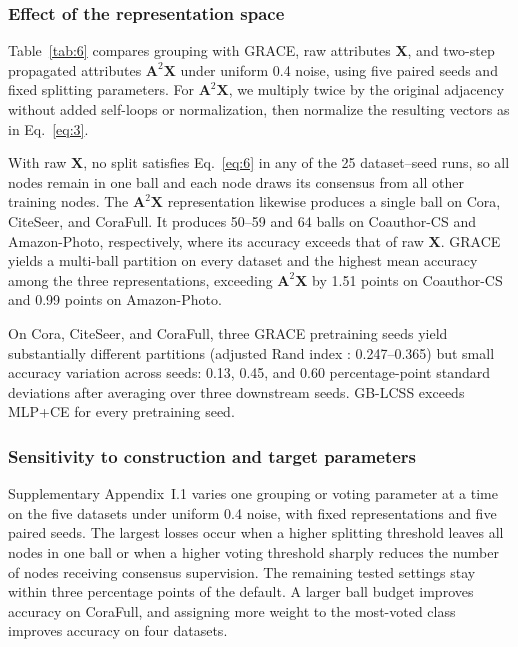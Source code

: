 \documentclass[times,review,10pt]{elsarticle}
\theoremstyle{definition}
\theoremstyle{plain}
\begin{document}
\subsubsection{Effect of the representation space}\label{sec:4.3.3}

Table~\ref{tab:6} compares grouping with GRACE, raw attributes \(\mathbf X\), and two-step propagated attributes \(\mathbf A^2\mathbf X\) under uniform 0.4 noise, using five paired seeds and fixed splitting parameters. For \(\mathbf A^2\mathbf X\), we multiply twice by the original adjacency without added self-loops or normalization, then normalize the resulting vectors as in Eq.~\eqref{eq:3}.



With raw \(\mathbf{X}\), no split satisfies Eq.~\eqref{eq:6} in any of the 25 dataset--seed runs, so all nodes remain in one ball and each node draws its consensus from all other training nodes. The \(\mathbf{A}^2\mathbf{X}\) representation likewise produces a single ball on Cora, CiteSeer, and CoraFull. It produces 50--59 and 64 balls on Coauthor-CS and Amazon-Photo, respectively, where its accuracy exceeds that of raw \(\mathbf{X}\). GRACE yields a multi-ball partition on every dataset and the highest mean accuracy among the three representations, exceeding \(\mathbf{A}^2\mathbf{X}\) by 1.51 points on Coauthor-CS and 0.99 points on Amazon-Photo. 

On Cora, CiteSeer, and CoraFull, three GRACE pretraining seeds yield substantially different partitions (adjusted Rand index \cite{ref74}: 0.247--0.365) but small accuracy variation across seeds: 0.13, 0.45, and 0.60 percentage-point standard deviations after averaging over three downstream seeds. GB-LCSS exceeds MLP+CE for every pretraining seed.

\subsubsection{Sensitivity to construction and target parameters}\label{sec:4.3.4}

Supplementary Appendix~I.1 varies one grouping or voting parameter at a time on the five datasets under uniform 0.4 noise, with fixed representations and five paired seeds. The largest losses occur when a higher splitting threshold leaves all nodes in one ball or when a higher voting threshold sharply reduces the number of nodes receiving consensus supervision. The remaining tested settings stay within three percentage points of the default. A larger ball budget improves accuracy on CoraFull, and assigning more weight to the most-voted class improves accuracy on four datasets.
\end{document}
